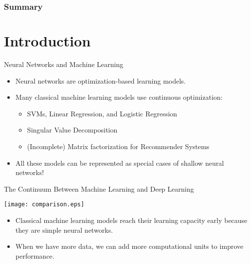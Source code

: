 

\subtitle{Machine Learning with Shallow Neural Networks}



\frame{\titlepage}

\begin{frame}
\frametitle{Summary}
{\tableofcontents}
\end{frame}

\section{Introduction}

\begin{frame}{Neural Networks and Machine Learning}
\begin{itemize}
\item Neural networks are optimization-based learning models.
\item  Many classical machine learning models  use
continuous optimization:
\begin{itemize}
\item SVMs, Linear Regression, and Logistic Regression
\item Singular Value Decomposition
\item (Incomplete) Matrix factorization for Recommender Systems
\end{itemize}
\item All these models can be represented as special cases of shallow neural
networks!
\end{itemize}
\end{frame}

\begin{frame}{The Continuum Between Machine Learning and Deep Learning}
\begin{center}
\texttt{[image: comparison.eps]}
\end{center}
\begin{itemize}
\item Classical machine learning models
 reach their learning capacity early because they are simple neural networks.
\item When we have more data, we can add more computational units to
improve performance.
\end{itemize}
\end{frame}


